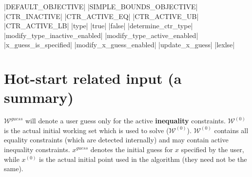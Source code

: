 \documentclass[12pt,a4paper]{article}
\begin{document}
|DEFAULT_OBJECTIVE|
|SIMPLE_BOUNDS_OBJECTIVE|
|CTR_INACTIVE|
|CTR_ACTIVE_EQ|
|CTR_ACTIVE_UB|
|CTR_ACTIVE_LB|
|type|
|true|
|false|
|determine_ctr_type|
|modify_type_inactive_enabled|
|modify_type_active_enabled|
|x_guess_is_specified|
|modify_x_guess_enabled|
|update_x_guess|
|lexlse|

\section{Hot-start related input (a summary)}

$\mathcal{W}^{\mathit{guess}}$ will denote a user guess only for the active {\bf inequality}
constraints. $\mathcal{W}^{(0)}$ is the actual initial working set which is used to solve
($\mathcal{W}^{(0)}$). $\mathcal{W}^{(0)}$ contains all equality constraints (which are
detected internally) and may contain active inequality constraints. $x^{\mathit{guess}}$ denotes the
initial guess for $x$ specified by the user, while $x^{(0)}$ is the actual initial point used in the
algorithm (they need not be the same).
\end{document}
